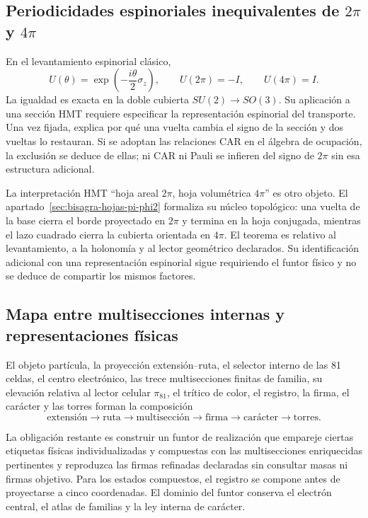 \subsection{Periodicidades espinoriales inequivalentes de \texorpdfstring{\(2\pi\)}{2 pi} y \texorpdfstring{\(4\pi\)}{4 pi}}

En el levantamiento espinorial cl\'asico,
\[
 U(\theta)=\exp\!\left(-\frac{i\theta}{2}\sigma_z\right),
 \qquad U(2\pi)=-I,
 \qquad U(4\pi)=I.
\]
La igualdad es exacta en la doble cubierta \(SU(2)\to SO(3)\). Su aplicaci\'on
a una secci\'on HMT requiere especificar la representaci\'on espinorial del
transporte. Una vez fijada, explica por qu\'e una vuelta cambia el signo de la
secci\'on y dos vueltas lo restauran. Si se adoptan las relaciones CAR en el
\'algebra de ocupaci\'on, la exclusi\'on se deduce de ellas; ni CAR ni Pauli se
infieren del signo de \(2\pi\) sin esa estructura adicional.

La interpretación HMT ``hoja areal \(2\pi\), hoja volum\'etrica \(4\pi\)'' es
otro objeto. El apartado~\ref{sec:bisagra-hojas-pi-phi2} formaliza su n\'ucleo
topol\'ogico: una vuelta de la base cierra el borde proyectado en \(2\pi\) y
termina en la hoja conjugada, mientras el lazo cuadrado cierra la cubierta
orientada en \(4\pi\). El teorema es relativo al levantamiento, a la holonom\'ia y al
lector geom\'etrico declarados. Su identificaci\'on adicional con una
representaci\'on espinorial sigue requiriendo el funtor f\'isico y no se deduce
de compartir los mismos factores.

\subsection{Mapa entre multisecciones internas y representaciones físicas}

El objeto part\'icula, la proyecci\'on
extensi\'on--ruta, el selector interno de las 81 celdas, el centro electr\'onico,
las trece multisecciones finitas de familia, su elevaci\'on relativa al lector
celular \(\pi_{81}\), el tr\'itico de color, el registro, la firma, el car\'acter y
las torres forman la composición
\[
\text{extensi\'on}\longrightarrow\text{ruta}\longrightarrow
\text{multisecci\'on}\longrightarrow\text{firma}\longrightarrow
\text{car\'acter}\longrightarrow\text{torres}.
\]

La obligación restante es construir un funtor de
realizaci\'on que empareje ciertas etiquetas f\'isicas individualizadas y
compuestas con las multisecciones enriquecidas pertinentes y reproduzca las
firmas refinadas declaradas sin consultar masas ni firmas objetivo. Para los
estados compuestos, el registro se compone antes de proyectarse a cinco
coordenadas. El dominio del funtor conserva el electr\'on central, el atlas de
familias y la ley interna de car\'acter.


